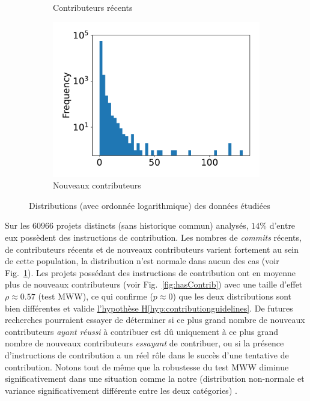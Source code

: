 \documentclass[dvipsnames,runningheads]{llncs}
\newcommand{\en}[1]{\foreignlanguage{english}{\emph{#1}}}
\begin{document}
\begin{figure}
\begin{subfigure}[t]{0.333\textwidth}
            \caption{Contributeurs récents}
        \end{subfigure}%
        \begin{subfigure}[t]{0.333\textwidth}
            \includegraphics[width=\textwidth]{../experiment/data_analysis/newContributorCount_distribution}
            \caption{Nouveaux contributeurs}
        \end{subfigure}
        \caption{Distributions (avec ordonnée logarithmique) des données étudiées}
        \label{fig:distribution}
    \end{figure}

    Sur les $60 966$ projets distincts (sans historique commun) analysés, $14\%$ d'entre eux possèdent des
    instructions de contribution. Les nombres de \en{commits} récents, de contributeurs récents et de nouveaux
    contributeurs varient fortement au sein de cette population, la distribution n'est normale dans aucun des
    cas (voir Fig.~\ref{fig:distribution}). Les projets possédant des instructions de contribution ont en
    moyenne plus de nouveaux contributeurs (voir Fig.~\ref{fig:hasContrib}) avec une taille d'effet $\rho
    \approx 0.57$ (test MWW), ce qui confirme ($p \approx 0$) que les deux distributions sont bien différentes
    et valide \hyperref[hyp:contributionguidelines]{l'hypothèse H\ref*{hyp:contributionguidelines}}. De
    futures recherches pourraient essayer de déterminer si ce plus grand nombre de nouveaux contributeurs
    \emph{ayant réussi} à contribuer est dû uniquement à ce plus grand nombre de nouveaux contributeurs
    \emph{essayant} de contribuer, ou si la présence d'instructions de contribution a un réel rôle dans le
    succès d'une tentative de contribution. Notons tout de même que la robustesse du test MWW diminue
    significativement dans une situation comme la notre (distribution non-normale et variance
    significativement différente entre les deux catégories) \parencite{WMW-robustness-1998}.
\end{document}
